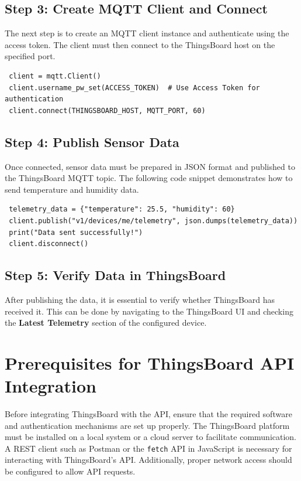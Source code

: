 \documentclass[a4paper,12pt]{report}
\begin{document}
 \subsection{Step 3: Create MQTT Client and Connect}
 The next step is to create an MQTT client instance and authenticate using the access token. The client must then connect to the ThingsBoard host on the specified port.
 
 \begin{lstlisting}
 client = mqtt.Client()
 client.username_pw_set(ACCESS_TOKEN)  # Use Access Token for authentication
 client.connect(THINGSBOARD_HOST, MQTT_PORT, 60)
 \end{lstlisting}
 
 \subsection{Step 4: Publish Sensor Data}
 Once connected, sensor data must be prepared in JSON format and published to the ThingsBoard MQTT topic. The following code snippet demonstrates how to send temperature and humidity data.
 
 \begin{lstlisting}
 telemetry_data = {"temperature": 25.5, "humidity": 60}
 client.publish("v1/devices/me/telemetry", json.dumps(telemetry_data))
 print("Data sent successfully!")
 client.disconnect()
 \end{lstlisting}
 
 \subsection{Step 5: Verify Data in ThingsBoard}
 After publishing the data, it is essential to verify whether ThingsBoard has received it. This can be done by navigating to the ThingsBoard UI and checking the \textbf{Latest Telemetry} section of the configured device.

 \section{Prerequisites for ThingsBoard API Integration}
 
 Before integrating ThingsBoard with the API, ensure that the required software and authentication mechanisms are set up properly. The ThingsBoard platform must be installed on a local system or a cloud server to facilitate communication. A REST client such as Postman or the \texttt{fetch} API in JavaScript is necessary for interacting with ThingsBoard’s API. Additionally, proper network access should be configured to allow API requests.
 
\end{document}
